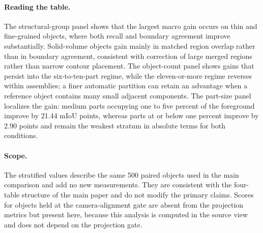 \documentclass[11pt]{article}
\begin{document}
\paragraph{Reading the table.}
The structural-group panel shows that the largest macro gain occurs on thin and fine-grained objects, where both recall and boundary agreement improve substantially. Solid-volume objects gain mainly in matched region overlap rather than in boundary agreement, consistent with correction of large merged regions rather than narrow contour placement. The object-count panel shows gains that persist into the six-to-ten-part regime, while the eleven-or-more regime reverses within assemblies; a finer automatic partition can retain an advantage when a reference object contains many small adjacent components. The part-size panel localizes the gain: medium parts occupying one to five percent of the foreground improve by 21.44 mIoU points, whereas parts at or below one percent improve by 2.90 points and remain the weakest stratum in absolute terms for both conditions.

\paragraph{Scope.}
The stratified values describe the same 500 paired objects used in the main comparison and add no new measurements. They are consistent with the four-table structure of the main paper and do not modify the primary claims. Scores for objects held at the camera-alignment gate are absent from the projection metrics but present here, because this analysis is computed in the source view and does not depend on the projection gate.
\end{document}
